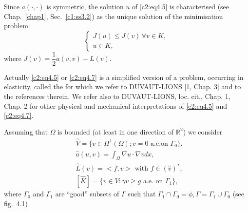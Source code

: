 \begin{remark}\label{c2:rem4.1}%
 Since $a(\cdot, \cdot)$ is symmetric, the solution $u$ of \eqref{c2:eq4.5} is
 characterised (see Chap.~\ref{chap1}, Sec.~\ref{c1:ss3.2}) as the
 unique solution of the  minimisation problem  
 \begin{equation}
\begin{cases}
J(u) \leq J (v)\, \forall  v \in K,\\
u \in K, \tag{4.7}\label{c2:eq4.7}
\end{cases}
 \end{equation}\pageoriginale  
 where $J(v) = \dfrac{1}{2}a(v, v) -L (v)$.  
\end{remark}

\begin{remark}\label{c2:rem4.2}%
Actually \eqref{c2:eq4.5} or \eqref{c2:eq4.7} is a simplified version
of a problem, occurring in elasticity, called the  for which we refer  to DUVAUT-LIONS [1, Chap. 3] and to the
references therein. We refer also to DUVAUT-LIONS, loc. cit., Chap. 1,
Chap. 2 for  other physical and mechanical interpretations of \eqref{c2:eq4.5}
and \eqref{c2:eq4.7}. 
\end{remark}

\begin{remark}\label{c2:rem4.3}%
Assuming that $\Omega$ is bounded (at least in one direction of
$\mathbb{R}^2$) we consider  
\begin{align*}
& \hat{V}= \{v \in H^1 (\Omega); v = 0 \text{ a.e.on } \Gamma_0
  \}. \tag{4.8}\label{c2:eq4.8}\\ 
& \hat{a}(u, v) = \int_\Omega \nabla  u \cdot \nabla v
  dx, \tag{4.9}\label{c2:eq4.9}\\ 
& \hat{L}(v) = <f, v> \text{ with } f \in (\hat{v})^*,
  \tag{4.10}\label{c2:eq4.10}\\ 
& [\hat{K}]= \{v \in V : \gamma v \geq g \text{ a.e. on }\Gamma_1
  \}, \tag{4.11}\label{c2:eq4.11}  
\end{align*}
where $\Gamma_0$ and $\Gamma_1$ are ``good'' subsets of $\Gamma$ such
that $\Gamma_1 \cap \Gamma_0 = \phi, \Gamma = \Gamma_1 \cup \Gamma_0$
(see fig.~4.1)
\setcounter{figure}{0} 
\begin{figure}[H]
  \caption{}
\end{figure}
\end{remark}


